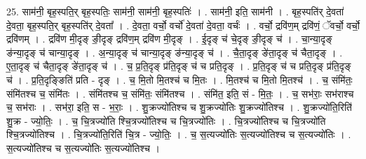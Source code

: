 \documentclass[17pt]{extarticle}
\begin{document}
25. साम॑नी॒ बृह॒स्पति॒र् बृह॒स्पतिः॒ साम॑नी॒ साम॑नी॒ बृह॒स्पतिः॑ । . साम॑नी॒ इति॒ साम॑नी । . बृह॒स्पति॑र् दे॒वता॑ दे॒वता॒ बृह॒स्पति॒र् बृह॒स्पति॑र् दे॒वता᳚ । . दे॒वता॒ वर्चो॒ वर्चो॑ दे॒वता॑ दे॒वता॒ वर्चः॑ । . वर्चो॒ द्रवि॑ण॒म् द्रवि॑णं॒ ॅवर्चो॒ वर्चो॒ द्रवि॑णम् । . द्रवि॑ण मी॒दृङ् ङी॒दृङ् द्रवि॑ण॒म् द्रवि॑ण मी॒दृङ् । . ई॒दृङ् च॑ चे॒दृङ् ङी॒दृङ् च॑ । . चा॒न्या॒दृङ् ङ॑न्या॒दृङ् च॑ चान्या॒दृङ् । . अ॒न्या॒दृङ् च॑ चान्या॒दृङ् ङ॑न्या॒दृङ् च॑ । . चै॒ता॒दृङ् ङे॑ता॒दृङ् च॑ चैता॒दृङ् । . ए॒ता॒दृङ् च॑ चैता॒दृङ् ङे॑ता॒दृङ् च॑ । . च॒ प्र॒ति॒दृङ् प्र॑ति॒दृङ् च॑ च प्रति॒दृङ् । . प्र॒ति॒दृङ् च॑ च प्रति॒दृङ् प्र॑ति॒दृङ् च॑ । . प्र॒ति॒दृङ्ङिति॑ प्रति - दृङ् । . च॒ मि॒तो मि॒तश्च॑ च मि॒तः । . मि॒तश्च॑ च मि॒तो मि॒तश्च॑ । . च॒ संमि॑तः॒ संमि॑तश्च च॒ संमि॑तः । . संमि॑तश्च च॒ संमि॑तः॒ संमि॑तश्च । . संमि॑त॒ इति॒ सं - मि॒तः॒ । . च॒ सभ॑राः॒ सभ॑राश्च च॒ सभ॑राः । . सभ॑रा॒ इति॒ स - भ॒राः॒ । . शु॒क्रज्यो॑तिश्च च शु॒क्रज्यो॑तिः शु॒क्रज्यो॑तिश्च । . शु॒क्रज्यो॑ति॒रिति॑ शु॒क्र - ज्यो॒तिः॒ । . च॒ चि॒त्रज्यो॑ति श्चि॒त्रज्यो॑तिश्च च चि॒त्रज्यो॑तिः । . चि॒त्रज्यो॑तिश्च च चि॒त्रज्यो॑ति श्चि॒त्रज्यो॑तिश्च । . चि॒त्रज्यो॑ति॒रिति॑ चि॒त्र - ज्यो॒तिः॒ । . च॒ स॒त्यज्यो॑तिः स॒त्यज्यो॑तिश्च च स॒त्यज्यो॑तिः । . स॒त्यज्यो॑तिश्च च स॒त्यज्यो॑तिः स॒त्यज्यो॑तिश्च । \newline
\end{document}
